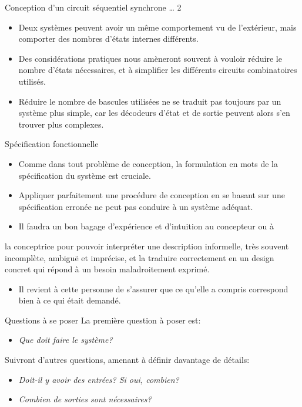 \documentclass[presentation]{beamer}
\begin{document}
\begin{frame}[label={sec:orgfbbc56e}]{Conception d'un circuit séquentiel synchrone \ldots{} 2}
\begin{itemize}
\item Deux systèmes peuvent avoir un même comportement vu de l'extérieur, mais comporter des nombres d'états internes différents.

\item Des considérations pratiques nous amèneront souvent à vouloir réduire le nombre d'états nécessaires, et à simplifier les différents circuits combinatoires utilisés.

\item Réduire le nombre de bascules utilisées ne se traduit pas toujours par un système plus simple, car les décodeurs d'état et de sortie peuvent alors s'en trouver plus complexes.
\end{itemize}
\end{frame}

\begin{frame}[label={sec:org7d7079b}]{Spécification fonctionnelle}
\begin{itemize}
\item Comme dans tout problème de conception, la formulation en mots de la spécification du système est cruciale.

\item Appliquer parfaitement une procédure de conception en se basant sur une spécification erronée ne peut pas conduire à un système adéquat.

\item Il faudra un bon bagage d'expérience et d'intuition au concepteur ou à
\end{itemize}
la conceptrice pour pouvoir interpréter une description informelle, très souvent  incomplète, ambiguë et imprécise, et la traduire
correctement en un design concret qui répond à un besoin maladroitement exprimé.

\begin{itemize}
\item Il revient à cette personne de s'assurer que ce qu'elle a compris correspond bien à ce qui était demandé.
\end{itemize}
\end{frame}

\begin{frame}[label={sec:org8ecccfe}]{Questions à se poser}
La première question à poser est: 

\begin{itemize}
\item \emph{Que doit faire le système?}
\end{itemize}

Suivront d'autres questions, amenant à définir davantage de détails: 

\begin{itemize}
\item \emph{Doit-il y avoir des entrées? Si oui, combien?}

\item \emph{Combien de sorties sont nécessaires?}
\end{itemize}
\end{frame}
\end{document}

